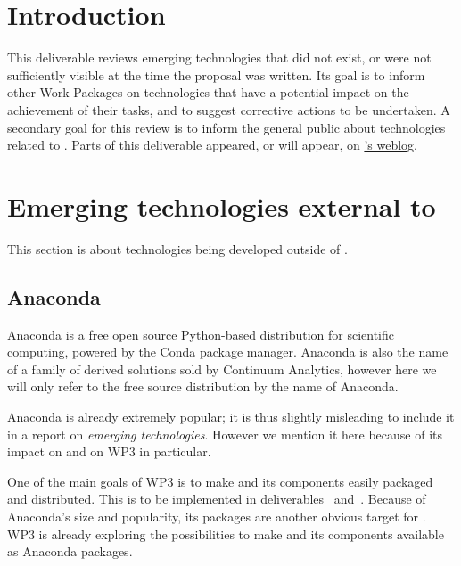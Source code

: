 \documentclass{deliverablereport}
\author{Erik Bray, Luca De Feo, Viviane Pons, Tom Wiesing}
\begin{document}
\maketitle
\githubissuedescription
\tableofcontents
\newpage

\section{Introduction}
This deliverable reviews emerging technologies that did not exist, or
were not sufficiently visible at the time the \ODK proposal was
written. Its goal is to inform other Work Packages on technologies
that have a potential impact on the achievement of their tasks, and to
suggest corrective actions to be undertaken.  A secondary goal for
this review is to inform the general public about technologies related
to \ODK. Parts of this deliverable appeared, or will appear, on
\href{http://opendreamkit.org}{\ODK's weblog}.

\section{Emerging technologies external to \ODK}
\label{sec:external}

This section is about technologies being developed outside of \ODK.

\subsection{Anaconda}
\label{sec:anaconda}

Anaconda is a free open source Python-based distribution for
scientific computing, powered by the Conda package manager. Anaconda
is also the name of a family of derived solutions sold by Continuum
Analytics, however here we will only refer to the free source
distribution by the name of Anaconda.

Anaconda is already extremely popular; it is thus slightly misleading
to include it in a report on \emph{emerging technologies}. However we
mention it here because of its impact on \ODK and on WP3 in
particular.

One of the main goals of WP3 is to make \Sage and its components
easily packaged and distributed. This is to be implemented in
deliverables~
and~. Because of
Anaconda's size and popularity, its packages are another obvious
target for \ODK. WP3 is already exploring the possibilities to make
\Sage and its components available as Anaconda packages.
\end{document}
